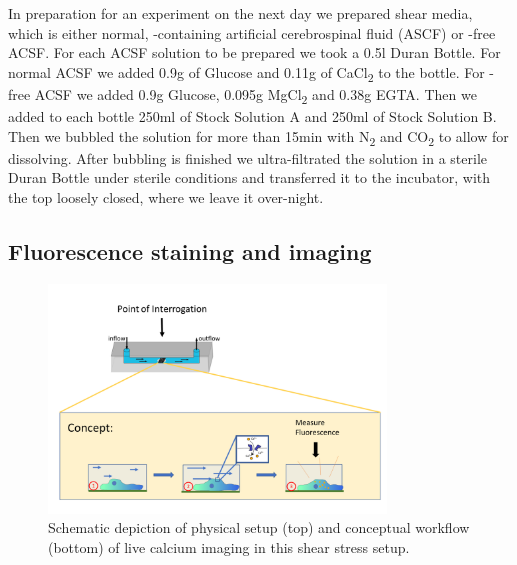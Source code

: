 In preparation for an experiment on the next day we prepared shear media, which is either normal, \calcium{}-containing artificial cerebrospinal fluid (ASCF) or \calcium{}-free ACSF. For each ACSF solution to be prepared we took a 0.5l Duran Bottle. For normal ACSF we added 0.9g of Glucose and 0.11g of CaCl\textsubscript{2} to the bottle. For \calcium{}-free ACSF we added 0.9g Glucose, 0.095g MgCl\textsubscript{2} and 0.38g EGTA. Then we added to each bottle 250ml of Stock Solution A and 250ml of Stock Solution B. Then we bubbled the solution for more than 15min with N\textsubscript{2} and CO\textsubscript{2} to allow for dissolving. After bubbling is finished we ultra-filtrated the solution in a sterile Duran Bottle under sterile conditions and transferred it to the incubator, with the top loosely closed, where we leave it over-night.

\subsection{Fluorescence staining and imaging}
\label{sec:LiveImaging}




\begin{figure}
	\centering
	\includegraphics[width = 0.8\textwidth]{FlowChamberSchematic.png}
	\caption{Schematic depiction of physical setup (top) and conceptual workflow (bottom) of live calcium imaging in this shear stress setup.}
	\label{fig:FlowChamberSchematic}
\end{figure}



